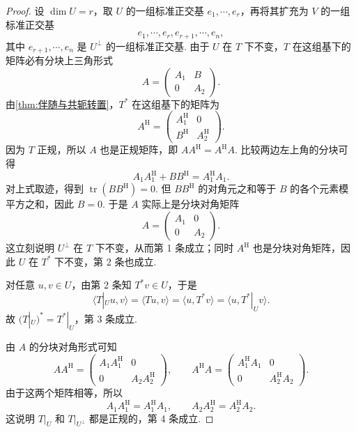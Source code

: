 \begin{proof}
    设 $ \dim U = r $，取 $ U $ 的一组标准正交基 $ e_1, \cdots, e_r $，再将其扩充为 $ V $ 的一组标准正交基
    \[
        e_1, \cdots, e_r, e_{r+1}, \cdots, e_n,
    \]
    其中 $ e_{r+1}, \cdots, e_n $ 是 $ U^\perp $ 的一组标准正交基. 由于 $ U $ 在 $ T $ 下不变，$ T $ 在这组基下的矩阵必有分块上三角形式
    \[
        A = \begin{pmatrix}
            A_1 & B \\
            0   & A_2
        \end{pmatrix}.
    \]
    由\autoref{thm:伴随与共轭转置}，$ T^* $ 在这组基下的矩阵为
    \[
        A^\mathrm{H} = \begin{pmatrix}
            A_1^\mathrm{H} & 0 \\
            B^\mathrm{H}   & A_2^\mathrm{H}
        \end{pmatrix}.
    \]
    因为 $ T $ 正规，所以 $ A $ 也是正规矩阵，即 $ A A^\mathrm{H} = A^\mathrm{H} A $. 比较两边左上角的分块可得
    \[
        A_1 A_1^\mathrm{H} + B B^\mathrm{H} = A_1^\mathrm{H} A_1.
    \]
    对上式取迹，得到 $\operatorname{tr}(B B^\mathrm{H}) = 0$. 但 $ B B^\mathrm{H} $ 的对角元之和等于 $ B $ 的各个元素模平方之和，因此 $ B = 0 $. 于是 $ A $ 实际上是分块对角矩阵
    \[
        A = \begin{pmatrix}
            A_1 & 0 \\
            0   & A_2
        \end{pmatrix}.
    \]
    这立刻说明 $ U^\perp $ 在 $ T $ 下不变，从而第 1 条成立；同时 $ A^\mathrm{H} $ 也是分块对角矩阵，因此 $ U $ 在 $ T^* $ 下不变，第 2 条也成立.

    对任意 $ u, v \in U $，由第 2 条知 $ T^*v \in U $，于是
    \[
        \langle T|_U u, v \rangle = \langle Tu, v \rangle = \langle u, T^*v \rangle = \langle u, T^*|_U v \rangle.
    \]
    故 $ (T|_U)^* = T^*|_U $，第 3 条成立.

    由 $ A $ 的分块对角形式可知
    \[
        A A^\mathrm{H} = \begin{pmatrix}
            A_1 A_1^\mathrm{H} & 0 \\
            0                  & A_2 A_2^\mathrm{H}
        \end{pmatrix},
        \qquad
        A^\mathrm{H} A = \begin{pmatrix}
            A_1^\mathrm{H} A_1 & 0 \\
            0                  & A_2^\mathrm{H} A_2
        \end{pmatrix}.
    \]
    由于这两个矩阵相等，所以
    \[
        A_1 A_1^\mathrm{H} = A_1^\mathrm{H} A_1, \qquad A_2 A_2^\mathrm{H} = A_2^\mathrm{H} A_2.
    \]
    这说明 $ T|_U $ 和 $ T|_{U^\perp} $ 都是正规的，第 4 条成立.
\end{proof}

